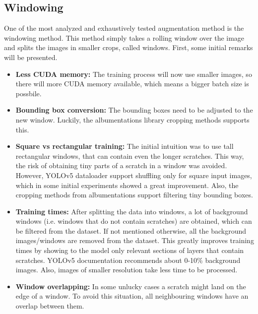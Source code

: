 \subsection{Windowing}
One of the most analyzed and exhaustively tested augmentation method is the windowing method. This method simply takes a rolling window over the image and splits the images in smaller crops, called windows. First, some initial remarks will be presented.
\begin{itemize}
\item \textbf{Less CUDA memory:} The training process will now use smaller images, so there will more CUDA memory available, which means a bigger batch size is possbile.
\item \textbf{Bounding box conversion:} The bounding boxes need to be adjusted to the new window. Luckily, the albumentations library cropping methods supports this.
\item \textbf{Square vs rectangular training:} The initial intuition was to use tall rectangular windows, that can contain even the longer scratches. This way, the risk of obtaining tiny parts of a scratch in a window was avoided. However, YOLOv5 dataloader support shuffling only for square input images, which in some initial experiments showed a great improvement. Also, the cropping methods from albumentations support filtering tiny bounding boxes.
\item \textbf{Training times:} After splitting the data into windows, a lot of background windows (i.e. windows that do not contain scratches) are obtained, which can be filtered from the dataset. If not mentioned otherwise, all the background images/windows are removed from the dataset. This greatly improves training times by showing to the model only relevant sections of layers that contain scratches. YOLOv5 documentation recommends about 0-10\% background images. Also, images of smaller resolution take less time to be processed.
\item \textbf{Window overlapping:} In some unlucky cases a scratch might land on the edge of a window. To avoid this situation, all neighbouring windows have an overlap between them.
\end{itemize}

